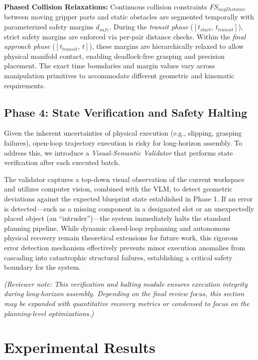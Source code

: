 \documentclass[journal]{IEEEtran}
\begin{document}
  \textbf{Phased Collision Relaxations:} Continuous collision constraints
  $FS_{negDistance}$ between moving gripper parts and static obstacles are
  segmented temporally with parameterized safety margins $d_{safe}$. During the
  \textit{transit phase} ($[t_{start},\, t_{transit}]$), strict safety margins are
  enforced via per-pair distance checks. Within the \textit{final approach phase}
  ($[t_{transit},\, t]$), these margins are hierarchically relaxed to allow physical
  manifold contact, enabling deadlock-free grasping and precision placement. The
  exact time boundaries and margin values vary across manipulation primitives to
  accommodate different geometric and kinematic requirements.

  \subsection{Phase 4: State Verification and Safety Halting}
  \label{subsec:phase4} Given the inherent uncertainties of physical execution (e.g.,
  slipping, grasping failures), open-loop trajectory execution is risky for long-horizon
  assembly. To address this, we introduce a \textit{Visual-Semantic Validator} that
  performs state verification after each executed batch.

  The validator captures a top-down visual observation of the current workspace and
  utilizes computer vision, combined with the VLM, to detect geometric deviations
  against the expected blueprint state established in Phase 1. If an error is detected---such
  as a missing component in a designated slot or an unexpectedly placed object (an
  ``intruder'')---the system immediately halts the standard planning pipeline.
  While dynamic closed-loop replanning and autonomous physical recovery remain
  theoretical extensions for future work, this rigorous error detection mechanism
  effectively prevents minor execution anomalies from cascading into catastrophic
  structural failures, establishing a critical safety boundary for the system.

  \textit{(Reviewer note: This verification and halting module ensures execution
  integrity during long-horizon assembly. Depending on the final review focus,
  this section may be expanded with quantitative recovery metrics or condensed to
  focus on the planning-level optimizations.)}

  \section{Experimental Results}
\end{document}
